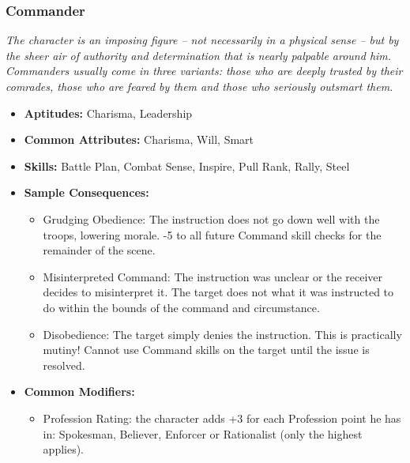 \subsubsection{Commander}\label{Commander}
\textit{The character is an imposing figure – not necessarily in a physical sense – but by the sheer air of authority and determination that is nearly palpable around him.
Commanders usually come in three variants: those who are deeply trusted by their comrades, those who are feared by them and those who seriously outsmart them.}
\begin{itemize}
	\item \textbf{Aptitudes:} Charisma, Leadership
	\item \textbf{Common Attributes:} Charisma, Will, Smart
	\item \textbf{Skills:} Battle Plan, Combat Sense, Inspire, Pull Rank, Rally, Steel
	\item \textbf{Sample Consequences:} 
	\begin{itemize}
		\item Grudging Obedience: The instruction does not go down well with the troops, lowering morale. -5 to all future Command skill checks for the remainder of the scene.
		\item Misinterpreted Command: The instruction was unclear or the receiver decides to misinterpret it. The target does not what it was instructed to do within the bounds of the command and circumstance.
		\item Disobedience: The target simply denies the instruction. This is practically mutiny! Cannot use Command skills on the target until the issue is resolved.
	\end{itemize}
	\item \textbf{Common Modifiers:}
	\begin{itemize}
		\item Profession Rating: the character adds +3 for each Profession point he has in: Spokesman, Believer, Enforcer or Rationalist (only the highest applies).
	\end{itemize}
\end{itemize}


